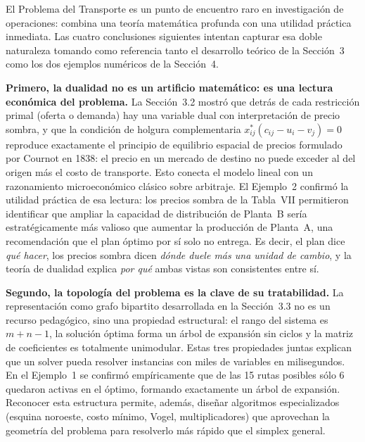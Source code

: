\documentclass[10pt,letterpaper,twocolumn]{article}
\begin{document}
El Problema del Transporte es un punto de encuentro raro en investigación de operaciones: combina una teoría matemática profunda con una utilidad práctica inmediata. Las cuatro conclusiones siguientes intentan capturar esa doble naturaleza tomando como referencia tanto el desarrollo teórico de la Sección~3 como los dos ejemplos numéricos de la Sección~4.

\textbf{Primero, la dualidad no es un artificio matemático: es una lectura económica del problema.} La Sección~3.2 mostró que detrás de cada restricción primal (oferta o demanda) hay una variable dual con interpretación de precio sombra, y que la condición de holgura complementaria $x_{ij}^*(c_{ij}-u_i-v_j)=0$ reproduce exactamente el principio de equilibrio espacial de precios formulado por Cournot en 1838: el precio en un mercado de destino no puede exceder al del origen más el costo de transporte. Esto conecta el modelo lineal con un razonamiento microeconómico clásico sobre arbitraje. El Ejemplo~2 confirmó la utilidad práctica de esa lectura: los precios sombra de la Tabla~VII permitieron identificar que ampliar la capacidad de distribución de Planta~B sería estratégicamente más valioso que aumentar la producción de Planta~A, una recomendación que el plan óptimo por sí solo no entrega. Es decir, el plan dice \emph{qué hacer}, los precios sombra dicen \emph{dónde duele más una unidad de cambio}, y la teoría de dualidad explica \emph{por qué} ambas vistas son consistentes entre sí.

\textbf{Segundo, la topología del problema es la clave de su tratabilidad.} La representación como grafo bipartito desarrollada en la Sección~3.3 no es un recurso pedagógico, sino una propiedad estructural: el rango del sistema es $m+n-1$, la solución óptima forma un árbol de expansión sin ciclos y la matriz de coeficientes es totalmente unimodular. Estas tres propiedades juntas explican que un solver pueda resolver instancias con miles de variables en milisegundos. En el Ejemplo~1 se confirmó empíricamente que de las 15 rutas posibles sólo 6 quedaron activas en el óptimo, formando exactamente un árbol de expansión. Reconocer esta estructura permite, además, diseñar algoritmos especializados (esquina noroeste, costo mínimo, Vogel, multiplicadores) que aprovechan la geometría del problema para resolverlo más rápido que el simplex general.
\end{document}
